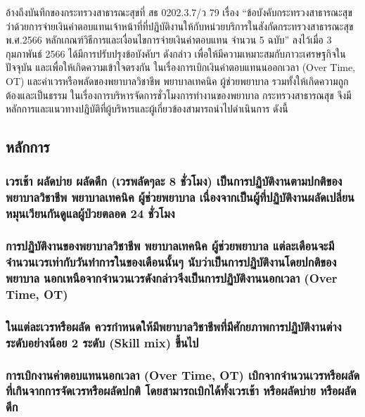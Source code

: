 อ้างถึงบันทึกของกระทรวงสาธารณะสุขที่ สธ 0202.3.7/ว 79 เรื่อง “ข้อบังคับกระทรวงสาธารณะสุขว่าด้วยการจ่ายเงินค่าตอบแทนเจ้าหน้าที่ที่ปฏิบัติงานให้กับหน่วยบริการในสังกัดกระทรวงสาธารณะสุข พ.ศ.2566 หลักเกณฑ์วิธีการและเงื่อนไขการจ่ายเงินค่าตอบแทน จำนวน 5 ฉบับ” ลงไว้เมื่อ 3 กุมภาพันธ์ 2566 ได้มีการปรับปรุงข้อบังคับฯ ดังกล่าว เพื่อให้มีความเหมาะสมกับภาวะเศรษฐกิจในปัจจุบัน และเพื่อให้เกิดความเข้าใจตรงกัน ในเรื่องการเบิกเงินค่าตอบแทนนออกเวลา (Over Time, OT) และค่าเวรหรือพลัดของพยาบาลวิชาชีพ พยาบาลเทคนิค ผู้ช่วยพยาบาล รวมทั้งให้เกิดความถูกต้องและเป็นธรรม ในเรื่องการบริหารจัดการชั่วโมงการทำงานของพยาบาล กระทรวงสาธารณสุข จึงมีหลักการและแนวทางปฎิบัติที่ผู้บริหารและผู้เกี่ยวข้องสามารถนำไปดำเนินการ ดังนี้

\hspace{0pt}\subsection{หลักการ}


\hspace{0.5cm}\hangindent=2.6cm\subsubsection{เวรเช้า ผลัดบ่าย ผลัดดึก (เวรพลัดๆละ 8 ชั่วโมง) เป็นการปฏิบัติงานตามปกติของพยาบาลวิชาชีพ พยาบาลเทคนิค ผู้ช่วยพยาบาล เนื่องจากเป็นผู้ที่ปฏิบัติงานผลัดเปลี่ยนหมุนเวียนกันดูแลผู้ป่วยตลอด 24 ชั่วโมง}

\hspace{0.5cm}\hangindent=2.6cm\subsubsection{การปฏิบัติงานของพยาบาลวิชาชีพ พยาบาลเทคนิค ผู้ช่วยพยาบาล แต่ละเดือนจะมีจำนวนเวรเท่ากับวันทำการในของเดือนนั้นๆ นับว่าเป็นการปฏิบัติงานโดยปกติของพยาบาล นอกเหนือจากจำนวนเวรดังกล่าวจึงเป็นการปฏิบัติงานนอกเวลา (Over Time, OT)}

\hspace{0.5cm}\hangindent=2.6cm\subsubsection{ในแต่ละเวรหรือผลัด ควรกำหนดให้มีพยาบาลวิชาชีพที่มีศักยภาพการปฏิบัติงานต่างระดับอย่างน้อย 2 ระดับ (Skill mix) ขึ้นไป}

\hspace{0.5cm}\hangindent=2.6cm\subsubsection{การเบิกงานค่าตอบแทนนอกเวลา (Over Time, OT) เบิกจากจำนวนเวรหรือผลัดที่เกินจากการจัดเวรหรือผลัดปกติ โดยสามารถเบิกได้ทั้งเวรเช้า หรือผลัดบ่าย หรือผลัดดึก}

